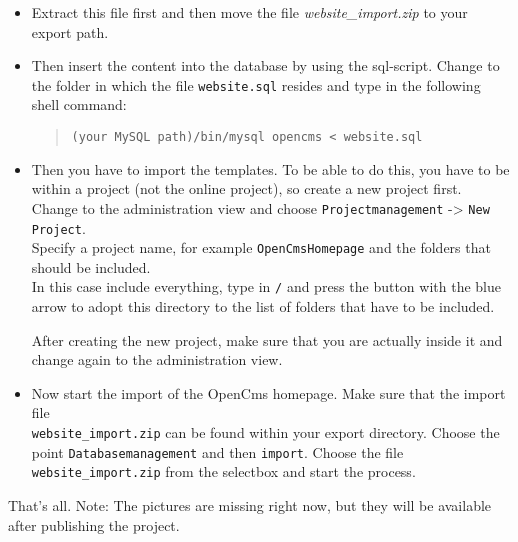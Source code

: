 \begin{itemize}
\item
Extract this file first and then move the file
\textit{website\_import.zip} to your export path.

\item
Then insert the content into the database by using the sql-script.
Change to the folder in which the file \texttt{website.sql}
resides and type in the following shell command:

\begin{quote}
\texttt{(your MySQL path)/bin/mysql opencms < website.sql}
\end{quote}

\item
Then you have to import the templates. To be able to do this, you
have to be within a project (not the online project), so create a
new
project first. \\
Change to the administration view and choose
\texttt{Projectmanagement}
-> \texttt{New Project}.\\
Specify a project name, for example \texttt{OpenCmsHomepage} and
the folders that
should be included. \\
In this case include everything, type in \texttt{/} and press the
button with the blue arrow to adopt this directory to the list of
folders that have to be included.

After creating the new project, make sure that you are actually
inside it and change again to the administration view.

\item
Now start the import of the OpenCms homepage.
Make sure that the import file \\
\texttt{website\_import.zip} can be found within your export
directory. Choose the point \texttt{Databasemanagement} and then
\texttt{import}. Choose the file \texttt{website\_import.zip} from
the selectbox and start the process.

\end{itemize}
That's all. Note: The pictures are missing right now, but they
will be available after publishing the project.
